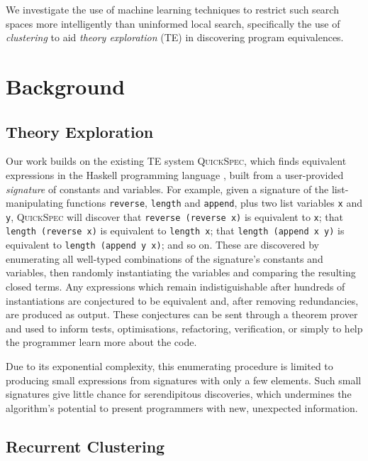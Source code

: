 \documentclass[]{default}
\begin{document}
We investigate the use of machine learning techniques to restrict such
search spaces more intelligently than uninformed local search,
specifically the use of \emph{clustering} to aid \emph{theory
exploration} (TE) in discovering program equivalences.

\section{Background}\label{background}

\subsection{Theory Exploration}\label{theory-exploration}

Our work builds on the existing TE system
\textsc{QuickSpec}\cite{QuickSpec}, which finds equivalent expressions
in the Haskell programming language \cite{marlow2010haskell}, built from a user-provided
\emph{signature} of constants and variables. For example, given a
signature of the list-manipulating functions \texttt{reverse},
\texttt{length} and \texttt{append}, plus two list variables \texttt{x}
and \texttt{y}, \textsc{QuickSpec} will discover that
\texttt{reverse\ (reverse\ x)} is equivalent to \texttt{x}; that
\texttt{length\ (reverse\ x)} is equivalent to \texttt{length\ x}; that
\texttt{length\ (append\ x\ y)} is equivalent to
\texttt{length\ (append\ y\ x)}; and so on. These are discovered by
enumerating all well-typed combinations of the signature's constants and
variables, then randomly instantiating the variables \cite{claessen2011quickcheck} and comparing the
resulting closed terms. Any expressions which remain indistiguishable
after hundreds of instantiations are conjectured to be equivalent and,
after removing redundancies, are produced as output. These conjectures
can be sent through a theorem prover \cite{claessen2013automating} and used to inform tests,
optimisations, refactoring, verification, or simply to help the
programmer learn more about the code.

Due to its exponential complexity, this enumerating procedure is limited
to producing small expressions from signatures with only a few elements.
Such small signatures give little chance for serendipitous discoveries,
which undermines the algorithm's potential to present programmers with
new, unexpected information.

\subsection{Recurrent Clustering}\label{recurrent-clustering}
\end{document}
